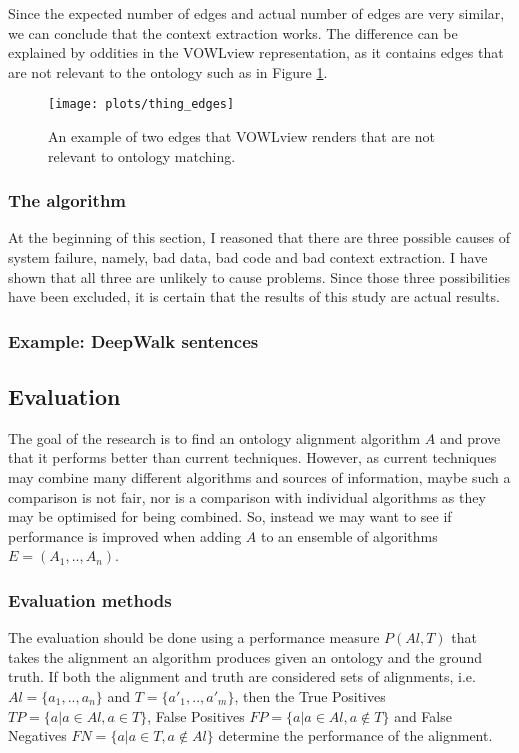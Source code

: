 \documentclass{article}
\begin{document}
  Since the expected number of edges and actual number of edges are very similar, we can conclude that the context extraction works. The difference can be explained by oddities in the VOWLview representation, as it contains edges that are not relevant to the ontology such as in Figure \ref{thing_edges}.
  
  \begin{figure}
  \centering
  \texttt{[image: plots/thing\_edges]}
  \caption[Addition edges example]{An example of two edges that VOWLview renders that are not relevant to ontology matching.}
  \label{thing_edges}
  \end{figure}
  
  \subsubsection{The algorithm}
  At the beginning of this section, I reasoned that there are three possible causes of system failure, namely, bad data, bad code and bad context extraction. I have shown that all three are unlikely to cause problems. Since those three possibilities have been excluded, it is certain that the results of this study are actual results.
 
 \subsubsection{Example: DeepWalk sentences} \label{sentences}
 
 \newpage
 \subsection{Evaluation}
 The goal of the research is to find an ontology alignment algorithm $A$ and prove that it performs better than current techniques. However, as current techniques may combine many different algorithms and sources of information, maybe such a comparison is not fair, nor is a comparison with individual algorithms as they may be optimised for being combined. So, instead we may want to see if performance is improved when adding $A$ to an ensemble of algorithms $E=(A_1,..,A_n)$.
 \subsubsection{Evaluation methods} \label{EvaluationMethods}
 The evaluation should be done using a performance measure $P(Al,T)$ that takes the alignment an algorithm produces given an ontology and the ground truth. If both the alignment and truth are considered sets of alignments, i.e. $Al=\{a_1,..,a_n\}$ and $T=\{a'_1,..,a'_m\}$, then the True Positives $TP=\{a|a\in Al, a\in T\}$, False Positives $FP=\{a|a\in Al, a\notin T\}$ and False Negatives $FN=\{a|a\in T, a\notin Al\}$ determine the performance of the alignment.
 
\end{document}
